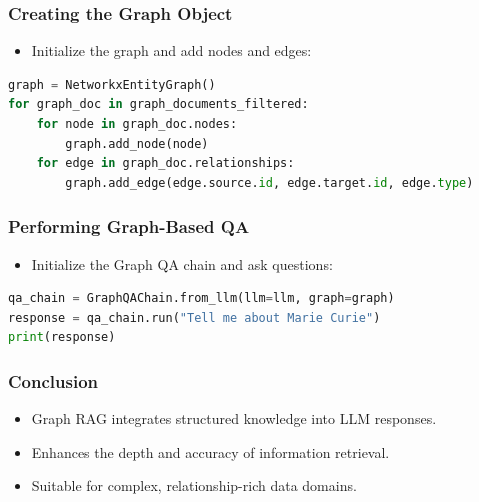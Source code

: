 \begin{frame}[fragile]\frametitle{Creating the Graph Object}
  \begin{itemize}
    \item Initialize the graph and add nodes and edges:
  \end{itemize}
  \begin{lstlisting}[language=python]
graph = NetworkxEntityGraph()
for graph_doc in graph_documents_filtered:
    for node in graph_doc.nodes:
        graph.add_node(node)
    for edge in graph_doc.relationships:
        graph.add_edge(edge.source.id, edge.target.id, edge.type)
  \end{lstlisting}
\end{frame}

\begin{frame}[fragile]\frametitle{Performing Graph-Based QA}
  \begin{itemize}
    \item Initialize the Graph QA chain and ask questions:
  \end{itemize}
  \begin{lstlisting}[language=python]
qa_chain = GraphQAChain.from_llm(llm=llm, graph=graph)
response = qa_chain.run("Tell me about Marie Curie")
print(response)
  \end{lstlisting}
\end{frame}

\begin{frame}[fragile]\frametitle{Conclusion}
  \begin{itemize}
    \item Graph RAG integrates structured knowledge into LLM responses.
    \item Enhances the depth and accuracy of information retrieval.
    \item Suitable for complex, relationship-rich data domains.
  \end{itemize}
\end{frame}



